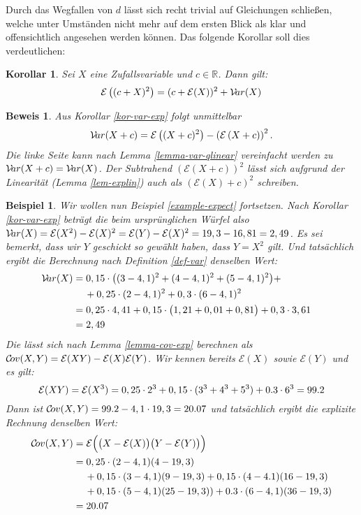 \documentclass[a4paper]{article}
\newtheorem{korollar}[satz]{Korollar}
\newtheorem{beispiel}[satz]{Beispiel}
\theoremstyle{nonumberplain}
\newtheorem{beweis}{Beweis}
\begin{document}
Durch das Wegfallen von $d$ lässt sich recht trivial auf Gleichungen schließen, welche unter Umständen nicht mehr auf dem ersten Blick als klar und offensichtlich angesehen werden können. Das folgende Korollar soll dies verdeutlichen:
\begin{korollar}
	Sei $X$ eine Zufallsvariable und $c \in \mathbb{R}$. Dann gilt:
	\begin{equation}
		\mathcal{E}\left((c+X)^2\right) = (c+ \mathcal{E}(X))^2 + \mathcal{V}\!ar(X)
	\end{equation}
\end{korollar}
\begin{beweis}
Aus Korollar \ref{kor-var-exp} folgt unmittelbar \[\mathcal{V}\!ar(X+c) = \mathcal{E}\left((X+c)^{2}\right) - \left(\mathcal{E}\left(X+c\right)\right)^{2}\text{.}\] Die linke Seite kann nach Lemma \ref{lemma-var-qlinear} vereinfacht werden zu $\mathcal{V}\!ar(X+c) = \mathcal{V}\!ar(X)$. Der Subtrahend $\left(\mathcal{E}\left(X+c\right)\right)^{2}$ lässt sich aufgrund der Linearität (Lemma \ref{lem-explin}) auch als $\left( \mathcal{E}(X)+c\right)^{2}$ 
schreiben.
\end{beweis}

\begin{beispiel}
	Wir wollen nun Beispiel \ref{example-expect} fortsetzen. 
	Nach Korollar \ref{kor-var-exp} beträgt die \var{} beim ursprünglichen Würfel also $\mathcal{V}\!ar(X) = \mathcal{E}(X^2) - \mathcal{E}(X)^2 = \mathcal{E}(Y) - \mathcal{E}(X)^2 = 19,3 - 16,81 = 2,49$. Es sei bemerkt, dass wir $Y$ geschickt so gewählt haben, dass $Y = X^2$ gilt. Und tatsächlich ergibt die Berechnung nach Definition \ref{def-var} denselben Wert:
	\begin{align*}
	\mathcal{V}\!ar(X) & = 0,15 \cdot \big((3- 4,1)^2 + (4-4,1)^2 + (5-4,1)^2\big) + && \\
	& \hspace{1.2em} + 0,25 \cdot (2 - 4,1)^2 + 0,3 \cdot (6-4,1)^2 && \\
	& = 0,25 \cdot 4,41 + 0,15 \cdot \big(1,21 + 0,01 + 0,81\big) + 0,3 \cdot 3,61 && \\
	& = 2,49 &&
	\end{align*}
	Die \cov{} lässt sich nach Lemma \ref{lemma-cov-exp} berechnen als $\mathcal{C}\!ov(X,Y) = \mathcal{E}(XY) - \mathcal{E}(X)\mathcal{E}(Y)$.
	Wir kennen bereits $\mathcal{E}(X)$ sowie $\mathcal{E}(Y)$ und es gilt:
	\[
		\mathcal{E}(XY) = \mathcal{E}(X^3) = 0,25 \cdot 2^3 + 0,15 \cdot (3^3 + 4^3 + 5^3) + 0.3 \cdot 6^3 = 99.2
	\]
	Dann ist  $\mathcal{C}\!ov(X,Y) = 99.2 - 4,1 \cdot 19,3 = 20.07$ und tatsächlich ergibt die explizite Rechnung denselben Wert:
	\begin{align*}
		\mathcal{C}\!ov(X,Y) &= \mathcal{E} \Big( \big(X - \mathcal{E}(X)\big)\big(Y - \mathcal{E}(Y) \big)\Big) \\
		&= 0,25 \cdot (2-4,1)(4-19,3) \\
		& \hspace{1.2em} + 0,15 \cdot (3-4,1)(9-19,3) + 0,15 \cdot (4-4.1)(16-19,3) \\
		& \hspace{1.2em} +  0,15 \cdot (5-4,1)(25-19,3)) + 0.3 \cdot (6-4,1)(36-19,3) \\
		&= 20.07
	\end{align*}
\end{beispiel}
\end{document}
